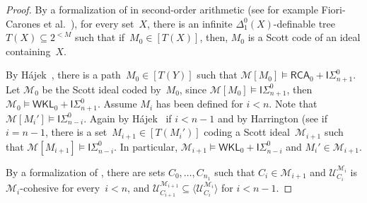 \documentclass{article}
\def\NN{\mathbb{N}}
\def\U{\mathcal{U}}
\def\M{\mathcal{M}}
\newcommand{\cs}{2^{\NN}}
\newcommand{\ISig}{\mathsf{I}\Sigma^0}
\newcommand{\RCA}{\mathsf{RCA}}
\newcommand{\WKL}{\mathsf{WKL}}
\numberwithin{theorem}{section}
\theoremstyle{definition}
\begin{document}
\begin{proof}
By a formalization of  in second-order arithmetic (see for example Fiori-Carones et al.~\cite[Lemma 3.2]{fiori2021isomorphism}), for every set~$X$, there is an infinite $\Delta^0_1(X)$-definable tree~$T(X) \subseteq 2^{<M}$ such that if~$M_0 \in [T(X)]$, then, $M_0$ is a Scott code of an ideal containing~$X$.

By H\'ajek~\cite{hajek1993interpretability},
there is a path~$M_0 \in [T(Y)]$ such that $\M[M_0] \models \RCA_0 + \ISig_{n+1}$. Let $\M_0$ be the Scott ideal coded by~$M_0$, since $\M[M_0] \models \ISig_{n+1}$, then $\M_0 \models \WKL_0 + \ISig_{n+1}$. 
Assume $M_i$ has been defined for $i < n$. Note that $\M[M_i'] \models \ISig_{n-i}$.
Again by H\'ajek~\cite{hajek1993interpretability} if $i < n-1$ and by Harrington (see \cite[Lemma 8.2]{cholak2001strength} if $i = n-1$, there is a set~$M_{i+1} \in [T(M_i')]$ coding a Scott ideal~$\M_{i+1}$
such that $\M[M_{i+1}] \models \ISig_{n-i}$. In particular, $\M_{i+1} \models \WKL_0 + \ISig_{n-i}$ and $M_i' \in \M_{i+1}$.

By a formalization of , there are sets $C_0, \dots, C_{n_1}$ such that
$C_i \in \M_{i+1}$ and $\U_{C_i}^{\M_i}$ is $\M_i$-cohesive for every~$i < n$, and $\U_{C_{i+1}}^{\M_{i+1}} \subseteq \langle \U_{C_i}^{\M_i} \rangle$ for $i < n-1$.





\end{proof}
\end{document}
